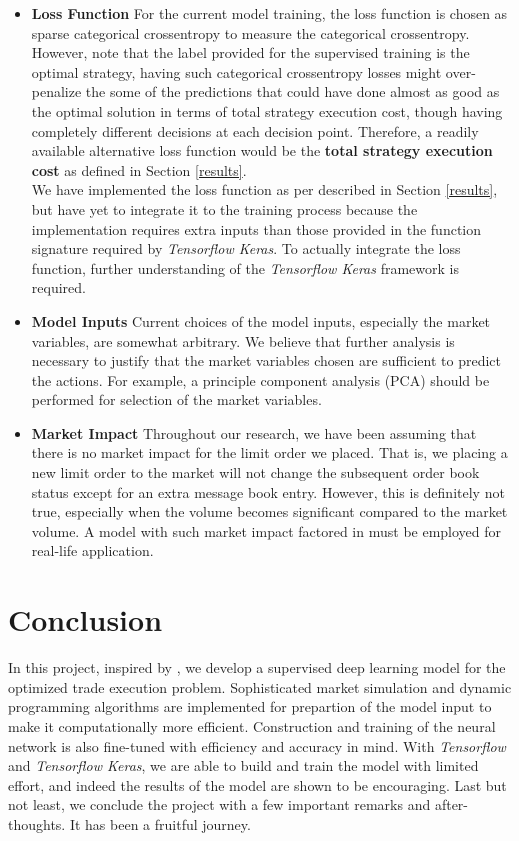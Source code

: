 \documentclass[12pt]{extarticle}
\begin{document}
\begin{itemize}
  \item \textbf{Loss Function} For the current model training, the loss function is chosen as
  sparse categorical crossentropy to measure the categorical crossentropy.
  However, note that the label provided for the supervised training is the optimal
  strategy, having such categorical crossentropy losses might over-penalize the
  some of the predictions that could have done almost as good as the optimal solution
  in terms of total strategy execution cost, though having completely different decisions
  at each decision point. Therefore, a readily available alternative loss function
  would be the \textbf{total strategy execution cost} as defined in Section \ref{results}.\\


  We have implemented the loss function as per described in Section \ref{results}, but have yet
  to integrate it to the training process because the implementation requires
  extra inputs than those provided in the function signature required by \textit{Tensorflow Keras}.
  To actually integrate the loss function, further understanding of the \textit{Tensorflow Keras}
  framework is required.

  \item \textbf{Model Inputs} Current choices of the model inputs, especially the
  market variables, are somewhat arbitrary. We believe that further analysis is necessary
  to justify that the market variables chosen are sufficient to predict the actions.
  For example, a principle component analysis (PCA) should be performed for selection of the
  market variables.

  \item \textbf{Market Impact} Throughout our research, we have been assuming that
  there is no market impact for the limit order we placed. That is, we placing a new
  limit order to the market will not change the subsequent order book status except
  for an extra message book entry. However, this is definitely not true, especially
  when the volume becomes significant compared to the market volume. A model with such
  market impact factored in \cite{market-impact} must be employed for real-life application.
\end{itemize}

\section{Conclusion}
In this project, inspired by \cite{reinforcement}, we develop a supervised deep learning model for the optimized trade
execution problem. Sophisticated market simulation and dynamic programming algorithms
are implemented for prepartion of the model input to make it computationally more
efficient. Construction and training of the neural network is also fine-tuned with
efficiency and accuracy in mind. With \textit{Tensorflow} and \textit{Tensorflow Keras},
we are able to build and train the model with limited effort, and indeed the results of the
model are shown to be encouraging. Last but not least, we conclude the project with
a few important remarks and after-thoughts. It has been a fruitful journey.
\end{document}
